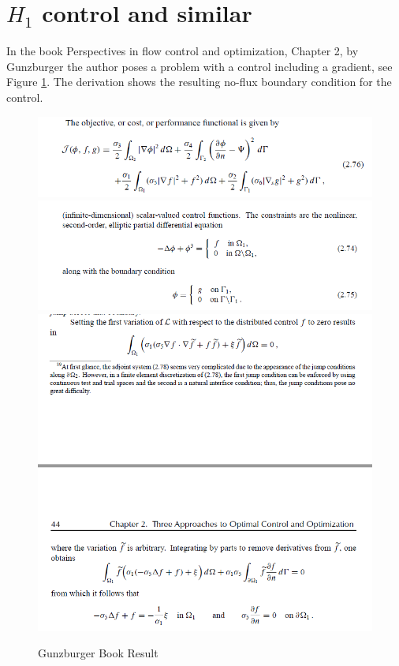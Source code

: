 \documentclass[11pt, a4paper]{article}
\theoremstyle{definition}
\begin{document}
\section{$H_1$ control and similar}
In the book Perspectives in flow control and optimization, Chapter 2, by Gunzburger the author poses a problem with a control including a gradient, see Figure \ref{F1}. The derivation shows the resulting no-flux boundary condition for the control.

	\begin{figure}[h]
		\centering
		\includegraphics[scale=0.7]{Cost.png}
		\includegraphics[scale=0.7]{Constraint.png}
		\includegraphics[scale=0.7]{GradientEqn.png}
		\caption{Gunzburger Book Result} 
		\label{F1}
	\end{figure}
\end{document}
